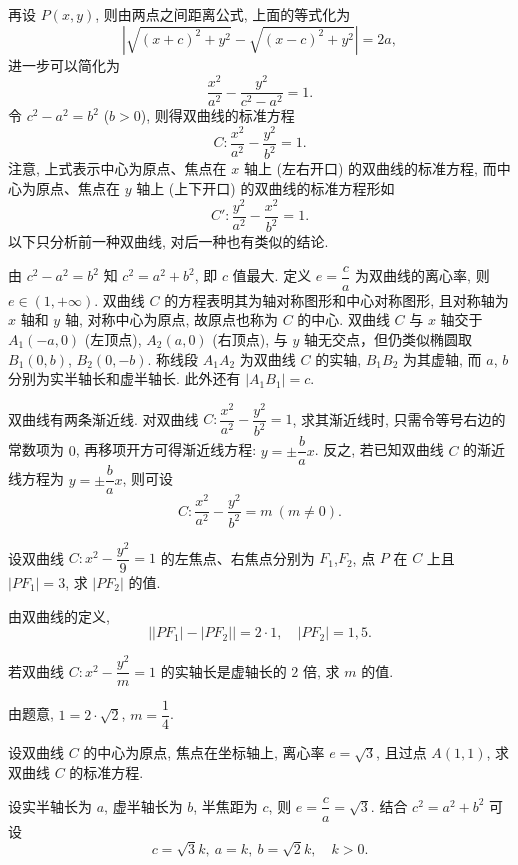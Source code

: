 再设 $P(x,y)$, 则由两点之间距离公式, 上面的等式化为
\[|\sqrt{(x+c)^2+y^2}-\sqrt{(x-c)^2+y^2}|= 2a,\]
进一步可以简化为
\[\frac{x^2}{a^2}-\frac{y^2}{c^2-a^2}=1.\]
令 $c^2-a^2=b^2$ ($b>0$), 则得双曲线的标准方程
\[C\colon \frac{x^2}{a^2}-\frac{y^2}{b^2}=1.\]
注意, 上式表示中心为原点、焦点在 $x$ 轴上 (左右开口) 的双曲线的标准方程, 而中心为原点、焦点在 $y$ 轴上 (上下开口) 的双曲线的标准方程形如
\[C'\colon \frac{y^2}{a^2}-\frac{x^2}{b^2}=1.\]
以下只分析前一种双曲线, 对后一种也有类似的结论.

由 $c^2-a^2=b^2$ 知 $c^2=a^2+b^2$, 即 $c$ 值最大. 定义 $e=\dfrac{c}a$ 为双曲线的离心率, 则 $e\in(1,+\infty)$.
双曲线 $C$ 的方程表明其为轴对称图形和中心对称图形, 且对称轴为 $x$ 轴和 $y$ 轴, 对称中心为原点, 故原点也称为 $C$ 的中心. 双曲线 $C$ 与 $x$ 轴交于 $A_1(-a,0)$ (左顶点), $A_2(a,0)$ (右顶点), 与 $y$ 轴无交点，但仍类似椭圆取 $B_1(0,b)$, $B_2(0,-b)$. 称线段 $A_1A_2$ 为双曲线 $C$ 的实轴, $B_1B_2$ 为其虚轴, 而 $a$, $b$ 分别为实半轴长和虚半轴长. 此外还有 $|A_1B_1|=c$.

双曲线有两条渐近线.
%
对双曲线 $C\colon \dfrac{x^2}{a^2}-\dfrac{y^2}{b^2}=1$, 求其渐近线时, 只需令等号右边的常数项为 $0$, 再移项开方可得渐近线方程: $y=\pm\dfrac{b}ax$. 反之, 若已知双曲线 $C$ 的渐近线方程为 $y=\pm\dfrac{b}ax$, 则可设
\[C\colon \frac{x^2}{a^2}-\frac{y^2}{b^2}=m\ (m\neq0).\]


\lianxi
\begin{exercise}
    设双曲线 $C\colon x^2- \dfrac{y^2}{9}=1$ 的左焦点、右焦点分别为 $F_1$,$F_2$, 点 $P$ 在 $C$ 上且 $|PF_1|= 3$, 求 $|PF_2|$ 的值.
\end{exercise}
\beginsolution
    由双曲线的定义,
    \[\bigl||PF_1|- |PF_2|\bigr|= 2\cdot 1,\quad
    |PF_2|= 1,5.\]
\endsolution

\begin{exercise}
    若双曲线 $C\colon x^2 -\dfrac{y^2}m =1$ 的实轴长是虚轴长的 $2$ 倍, 求 $m$ 的值.
\end{exercise}
\beginsolution
    由题意, $1= 2\cdot \sqrt2$, $m=\dfrac14$.
\endsolution

\begin{exercise}
    设双曲线 $C$ 的中心为原点, 焦点在坐标轴上, 离心率 $e=\sqrt3$, 且过点 $A(1,1)$, 求双曲线 $C$ 的标准方程.
\end{exercise}
\beginsolution
    设实半轴长为 $a$, 虚半轴长为 $b$, 半焦距为 $c$, 则 $e= \dfrac{c}a= \sqrt3$. 结合 $c^2= a^2+b^2$ 可设
    \[c=\sqrt3k,\ a=k,\ b=\sqrt2k,\quad k>0.\]

